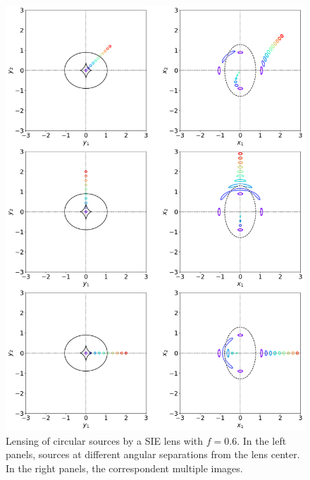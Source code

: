 \begin{figure}
    \centering
    \includegraphics[width=0.9\linewidth, keepaspectratio]{img//chapter3/sie_multiple_images.png}
    \caption[Lensing of circular sources by a SIE]{Lensing of circular sources by a SIE lens with $f=0.6$. In the left panels, sources at different angular separations from the lens center. In the right panels, the correspondent multiple images.}
    \label{fig:sie_multiple_images}
\end{figure}


